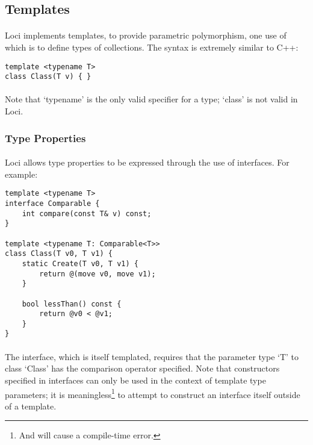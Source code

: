 \documentclass[12pt,twoside,notitlepage]{report}
\begin{document}
\clearpage

\subsection{Templates}

\paragraph{}
Loci implements templates, to provide parametric polymorphism, one use of which is to define types of collections. The syntax is extremely similar to C++:

\begin{lstlisting}
template <typename T>
class Class(T v) { }
\end{lstlisting}

\paragraph{}
Note that `typename' is the only valid specifier for a type; `class' is not valid in Loci.

\subsubsection{Type Properties}

\paragraph{}
Loci allows type properties to be expressed through the use of interfaces. For example:

\begin{lstlisting}
template <typename T>
interface Comparable {
	int compare(const T& v) const;
}

template <typename T: Comparable<T>>
class Class(T v0, T v1) {
	static Create(T v0, T v1) {
		return @(move v0, move v1);
	}
	
	bool lessThan() const {
		return @v0 < @v1;
	}
}
\end{lstlisting}

\paragraph{}
The interface, which is itself templated, requires that the parameter type `T' to class `Class' has the comparison operator specified. Note that constructors specified in interfaces can only be used in the context of template type parameters; it is meaningless\footnote{And will cause a compile-time error.} to attempt to construct an interface itself outside of a template.
\end{document}
